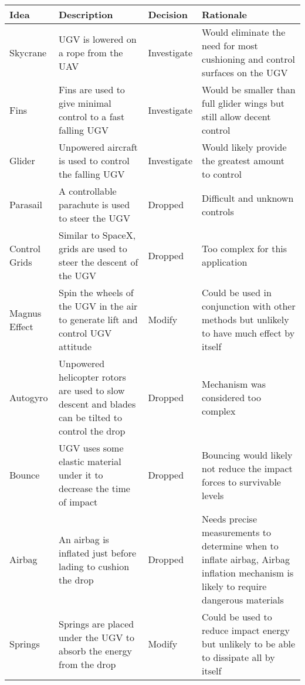 \documentclass[]{auvsi_doc}
\begin{document}
\begin{AUVSITitlePage}
\begin{artifacttable}
\end{artifacttable}
\end{AUVSITitlePage}



\begin{longtable}[H]{|p{}|p{}|p{}|p{}|}
\hline
\textbf{Idea}	&	\textbf{Description}	&	\textbf{Decision} &	\textbf{Rationale} \\
\hline
Skycrane & UGV is lowered on a rope from the UAV & Investigate & Would eliminate the need for most cushioning and control surfaces on the UGV\\
\hline
Fins & Fins are used to give minimal control to a fast falling UGV & Investigate & Would be smaller than full glider wings but still allow decent control\\
\hline
Glider & Unpowered aircraft is used to control the falling UGV & Investigate & Would likely provide the greatest amount to control\\
\hline
Parasail & A controllable parachute is used to steer the UGV & Dropped & Difficult and unknown controls \\
\hline
Control Grids & Similar to SpaceX, grids are used to steer the descent of the UGV & Dropped & Too complex for this application \\
\hline
Magnus Effect & Spin the wheels of the UGV in the air to generate lift and control UGV attitude & Modify & Could be used in conjunction with other methods but unlikely to have much effect by itself\\
\hline
Autogyro & Unpowered helicopter rotors are used to slow descent and blades can be tilted to control the drop & Dropped & Mechanism was considered too complex \\
\hline
Bounce & UGV uses some elastic material under it to decrease the time of impact & Dropped & Bouncing would likely not reduce the impact forces to survivable levels \\
\hline
Airbag & An airbag is inflated just before lading to cushion the drop & Dropped & Needs precise measurements to determine when to inflate airbag, Airbag inflation mechanism is likely to require dangerous materials\\
\hline
Springs & Springs are placed under the UGV to absorb the energy from the drop & Modify & Could be used to reduce impact energy but unlikely to be able to dissipate all by itself \\

\end{longtable}
\end{document}
